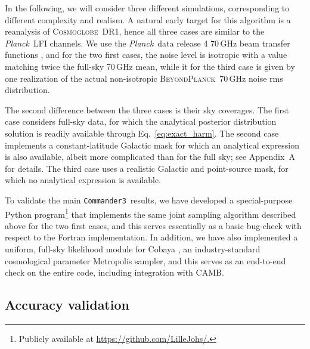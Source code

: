 \documentclass[twocolumn]{../common/aa}
\def\planck{\emph{Planck}}
\def\Planck{\emph{Planck}}
\def\commanderthree{\texttt{Commander3}}
\newcommand{\BP}{\textsc{BeyondPlanck}}
\newcommand{\cosmoglobe}{\textsc{Cosmoglobe}}
\begin{document}
In the following, we will consider three different simulations, corresponding to different complexity and realism. A natural early target for this algorithm is a reanalysis of \cosmoglobe\ DR1, hence all three cases are similar to the \Planck\ LFI channels. We use the \planck\ data release 4 70\,GHz beam transfer functions \citep{planck2020-LVII}, and for the two first cases, the noise level is isotropic with a value matching twice the full-sky 70\,GHz mean, while it for the third case is given by one realization of the actual non-isotropic \BP\ 70\,GHz noise rms distribution.

The second difference between the three cases is their sky coverages. The first case considers full-sky data, for which the analytical posterior distribution solution is readily available through Eq.~\eqref{eq:exact_harm}. The second case implements a constant-latitude Galactic mask for which an analytical expression is also available, albeit more complicated than for the full sky; see Appendix~A for details. The third case uses a realistic Galactic and point-source mask, for which no analytical expression is available. 

To validate the main \commanderthree\ results, we have developed a special-purpose Python program\footnote{Publicly available at \url{https://github.com/LilleJohs/.}} that implements the same joint sampling algorithm described above for the two first cases, and this serves essentially as a basic bug-check with respect to the Fortran implementation. In addition, we have also implemented a uniform, full-sky likelihood module for Cobaya \citep{Torrado:2020dgo}, an industry-standard cosmological parameter Metropolis sampler, and this serves as an end-to-end check on the entire code, including integration with CAMB.

\subsection{Accuracy validation}
\end{document}

